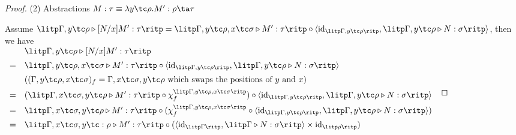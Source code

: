 \begin{proof}
(2) Abstractions $ M: \tau \equiv \lambda y \tc \rho . M' : \rho \ta \tau $

Assume $ \litp \Gamma , y \tc \rho \triangleright [N/x]M': \tau \ritp = \litp \Gamma , y \tc \rho , x \tc \sigma \triangleright M': \tau \ritp \circ \langle \text{id}_{\litp \Gamma , y \tc \rho \ritp} , \litp \Gamma , y \tc \rho \triangleright N: \sigma \ritp \rangle $, then we have \\[5pt]
$
\begin{array}{rl}
   & \litp \Gamma , y \tc \rho \triangleright [N/x]M': \tau \ritp \\[5pt]
 = & \litp \Gamma , y \tc \rho , x \tc \sigma \triangleright M': \tau \ritp \circ \langle \text{id}_{\litp \Gamma , y \tc \rho \ritp} , \litp \Gamma , y \tc \rho \triangleright N: \sigma \ritp \rangle \\[5pt]
   & ((\Gamma , y \tc \rho , x \tc \sigma )_f = \Gamma , x \tc \sigma , y \tc \rho \text{ which swaps the positions of } y \text{ and } x) \\[5pt]
 = & (\litp \Gamma , x \tc \sigma , y \tc \rho \triangleright M': \tau \ritp \circ \chi_f^{\litp \Gamma , y \tc \rho , x \tc \sigma \ritp}) \circ \langle \text{id}_{\litp \Gamma , y \tc \rho \ritp} , \litp \Gamma , y \tc \rho \triangleright N: \sigma \ritp \rangle \\[5pt]
 = & \litp \Gamma , x \tc \sigma , y \tc \rho \triangleright M': \tau \ritp \circ ( \chi_f^{\litp \Gamma , y \tc \rho , x \tc \sigma \ritp} \circ \langle \text{id}_{\litp \Gamma , y \tc \rho \ritp} , \litp \Gamma , y \tc \rho \triangleright N: \sigma \ritp \rangle ) \\[5pt]
 = & \litp \Gamma , x \tc \sigma , y \tc: \rho \triangleright M': \tau \ritp \circ ( \langle \text{id}_{\litp \Gamma \ritp} , \litp \Gamma \triangleright N: \sigma \ritp \rangle \times \text{id}_{\litp \rho \ritp} ) \\[10pt]
\end{array}
$


\end{proof}

